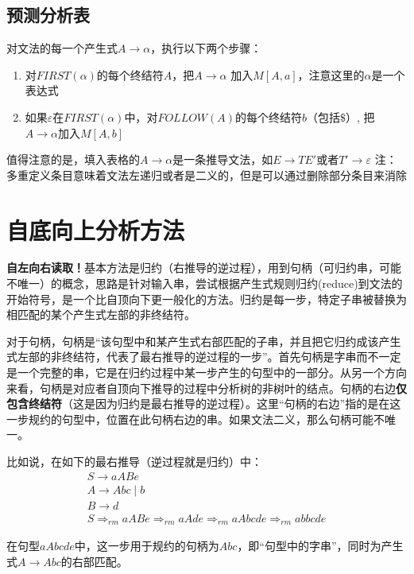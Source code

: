 \documentclass[]{report}
\begin{document}
		\subsection{预测分析表}
		对文法的每一个产生式$A\to\alpha$，执行以下两个步骤：
		\begin{enumerate}
			\item 对$FIRST(\alpha)$的每个终结符$A$，把$A\to\alpha$ 加入$M[A, a]$，注意这里的$\alpha$是一个表达式
			\item 如果$\varepsilon$在$FIRST(\alpha)$中，$对FOLLOW(A)$的每个终结符$b$（包括$\$$）, 把$A\to\alpha$加入$M[A, b]$
		\end{enumerate}
		值得注意的是，填入表格的$A\to\alpha$是一条推导文法，如$E\to TE'$或者$T'\to\varepsilon$
		注：多重定义条目意味着文法左递归或者是二义的，但是可以通过删除部分条目来消除
	\section{自底向上分析方法}
		\textbf{自左向右读取！}基本方法是归约（右推导的逆过程），用到句柄（可归约串，可能不唯一）的概念，思路是针对输入串，尝试根据产生式规则归约(reduce)到文法的开始符号，是一个比自顶向下更一般化的方法。归约是每一步，特定子串被替换为相匹配的某个产生式左部的非终结符。\par
		对于句柄，句柄是“该句型中和某产生式右部匹配的子串，并且把它归约成该产生式左部的非终结符，代表了最右推导的逆过程的一步”。首先句柄是字串而不一定是一个完整的串，它是在归约过程中某一步产生的句型中的一部分。从另一个方向来看，句柄是对应者自顶向下推导的过程中分析树的非树叶的结点。句柄的右边\textbf{仅包含终结符}（这是因为归约是最右推导的逆过程）。这里“句柄的右边”指的是在这一步规约的句型中，位置在此句柄右边的串。如果文法二义，那么句柄可能不唯一。\par
		比如说，在如下的最右推导（逆过程就是归约）中：
		\[\begin{gathered}
			S\to aABe\\
			A\to Abc\mid b\\
			B\to d\\
			S\Rightarrow_{rm}aABe\Rightarrow_{rm}aAde\Rightarrow_{rm}aAbcde\Rightarrow_{rm}abbcde
		\end{gathered}\]\par
		在句型$aAbcde$中，这一步用于规约的句柄为$Abc$，即“句型中的字串”，同时为产生式$A\to Abc$的右部匹配。
\end{document}
